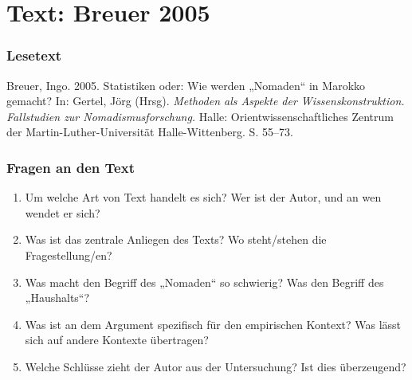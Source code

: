 \documentclass[
  ngerman,
]{article}
\providecommand{\tightlist}{%
  \setlength{\itemsep}{0pt}\setlength{\parskip}{0pt}}
\begin{document}
\hypertarget{text-breuer-2005}{%
\section{Text: Breuer 2005}\label{text-breuer-2005}}

\hypertarget{lesetext-3}{%
\subsubsection{Lesetext}\label{lesetext-3}}

Breuer, Ingo. 2005. Statistiken oder: Wie werden „Nomaden`` in Marokko gemacht? In: Gertel, Jörg (Hrsg). \emph{Methoden als Aspekte der Wissenskonstruktion. Fallstudien zur Nomadismusforschung.} Halle: Orientwissenschaftliches Zentrum der Martin-Luther-Universität Halle-Wittenberg. S. 55--73.

\hypertarget{fragen-an-den-text-4}{%
\subsubsection{Fragen an den Text}\label{fragen-an-den-text-4}}

\begin{enumerate}
\def\labelenumi{\arabic{enumi}.}
\tightlist
\item
  Um welche Art von Text handelt es sich? Wer ist der Autor, und an wen wendet er sich?
\item
  Was ist das zentrale Anliegen des Texts? Wo steht/stehen die Fragestellung/en?
\item
  Was macht den Begriff des „Nomaden`` so schwierig? Was den Begriff des „Haushalts``?
\item
  Was ist an dem Argument spezifisch für den empirischen Kontext? Was lässt sich auf andere Kontexte übertragen?
\item
  Welche Schlüsse zieht der Autor aus der Untersuchung? Ist dies überzeugend?
\end{enumerate}
\end{document}

